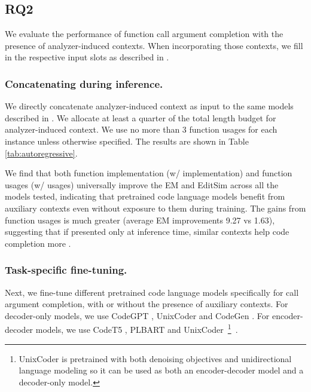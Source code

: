 \subsection{RQ2}
\label{sec:task-specific-experiments}
We evaluate the performance of function call argument completion with the presence of analyzer-induced contexts.
When incorporating those contexts, we fill in the respective input slots as described in . 

\subsubsection{Concatenating during inference.}

We directly concatenate analyzer-induced context as input to the same models described in . 
We allocate at least a quarter of the total length budget for analyzer-induced context. 
We use no more than 3 function usages for each instance unless otherwise specified.%
The results are shown in Table \ref{tab:autoregressive}. 

We find that both function implementation (w/ implementation) and function usages (w/ usages) universally improve the EM and EditSim across all the models tested, 
indicating that pretrained code language models benefit from auxiliary contexts even without exposure to them during training.
The gains from function usages is much greater (average EM improvements 9.27 vs 1.63), suggesting that if presented only at inference time, similar contexts help code completion more \citep[cf. similar observations from][]{lu2022reacc}.



\subsubsection{Task-specific fine-tuning.}
\label{sec:call-args-completion-results}

Next, we fine-tune different pretrained code language models specifically for call argument completion, with or without the presence of auxiliary contexts.
For decoder-only models, we use CodeGPT \citep{lu2021codexglue}, UnixCoder \citep{guo2022unixcoder} and CodeGen \citep{nijkamp2022conversational}. 
For encoder-decoder models, we use CodeT5 \citep{wang2021codet5}, PLBART \citep{ahmad2021unified} and UnixCoder~\footnote{UnixCoder is pretrained with both denoising objectives and unidirectional language modeling so it can be used as both an encoder-decoder model and a decoder-only model.}~\citep{guo2022unixcoder}. 

